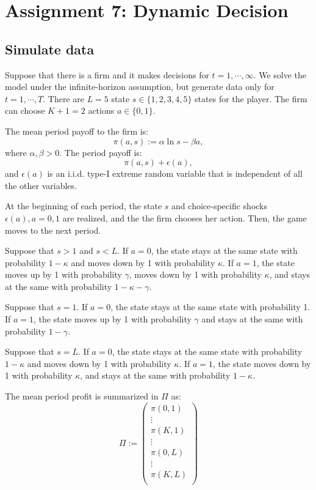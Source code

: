 \documentclass[
]{book}
\begin{document}
\hypertarget{assignment7}{%
\chapter{Assignment 7: Dynamic Decision}\label{assignment7}}

\hypertarget{simulate-data-6}{%
\section{Simulate data}\label{simulate-data-6}}

Suppose that there is a firm and it makes decisions for \(t = 1, \cdots, \infty\). We solve the model under the infinite-horizon assumption, but generate data only for \(t = 1, \cdots, T\). There are \(L = 5\) state \(s \in \{1, 2, 3, 4, 5\}\) states for the player. The firm can choose \(K + 1 = 2\) actions \(a \in \{0, 1\}\).

The mean period payoff to the firm is:
\[
\pi(a, s) :=  \alpha \ln s - \beta a,
\]
where \(\alpha, \beta > 0\). The period payoff is:
\[
\pi(a, s) + \epsilon(a),
\]
and \(\epsilon(a)\) is an i.i.d. type-I extreme random variable that is independent of all the other variables.

At the beginning of each period, the state \(s\) and choice-specific shocks \(\epsilon(a), a = 0, 1\) are realized, and the the firm chooses her action. Then, the game moves to the next period.

Suppose that \(s > 1\) and \(s < L\). If \(a = 0\), the state stays at the same state with probability \(1 - \kappa\) and moves down by 1 with probability \(\kappa\). If \(a = 1\), the state moves up by 1 with probability \(\gamma\), moves down by 1 with probability \(\kappa\), and stays at the same with probability \(1 - \kappa - \gamma\).

Suppose that \(s = 1\). If \(a = 0\), the state stays at the same state with probability 1. If \(a = 1\), the state moves up by 1 with probability \(\gamma\) and stays at the same with probability \(1 - \gamma\).

Suppose that \(s = L\). If \(a = 0\), the state stays at the same state with probability \(1 - \kappa\) and moves down by 1 with probability \(\kappa\). If \(a = 1\), the state moves down by 1 with probability \(\kappa\), and stays at the same with probability \(1 - \kappa\).

The mean period profit is summarized in \(\Pi\) as:
\[
\Pi :=
\begin{pmatrix}
\pi(0, 1)\\
\vdots\\
\pi(K, 1)\\
\vdots \\
\pi(0, L)\\
\vdots\\
\pi(K, L)\\
\end{pmatrix}
\]
\end{document}

